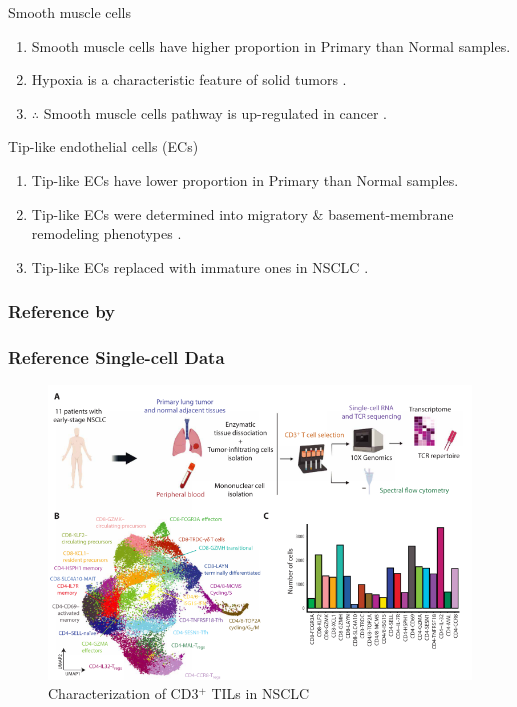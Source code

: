 \documentclass{beamer}
\begin{document}
\begin{frame}[allowframebreaks]
        \begin{block}{Smooth muscle cells}
            \begin{enumerate}
                \item Smooth muscle cells have higher proportion in Primary than Normal samples.
                \item Hypoxia is a characteristic feature of solid tumors \cite{hypoxia-1, hypoxia-2}.
                \item $\therefore$ Smooth muscle cells pathway is up-regulated in cancer \cite{smooth-1, smooth-2}.
            \end{enumerate}
        \end{block}

        \begin{block}{Tip-like endothelial cells (ECs)}
            \begin{enumerate}
                \item Tip-like ECs have lower proportion in Primary than Normal samples.
                \item Tip-like ECs were determined into migratory \& basement-membrane remodeling phenotypes \cite{tip-2}.
                \item Tip-like ECs replaced with immature ones in NSCLC \cite{tip-1}.
            \end{enumerate}
        \end{block}
    \end{frame}

    \subsubsection{Reference by \protect{}}
    \begin{frame}
        \frametitle{Reference Single-cell Data}

        \begin{figure}
            \includegraphics[width=0.8 \linewidth]{figures/LungCancer/reference_2.png}
            \caption{Characterization of CD3$^+$ TILs in NSCLC \protect\cite{singlecell2}}
        \end{figure}
    \end{frame}
\end{document}
